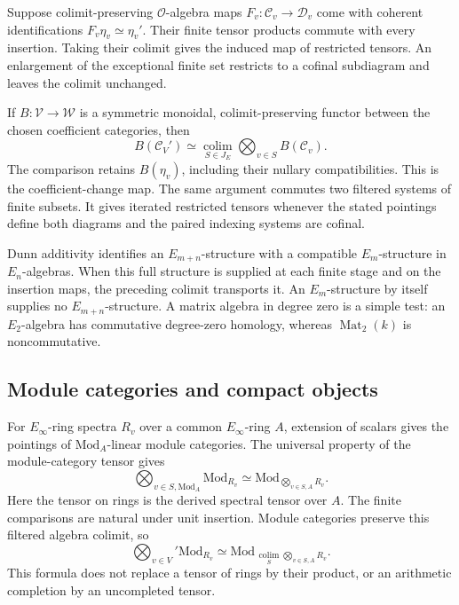 Suppose colimit-preserving \(\mathcal O\)-algebra maps
\(F_v:\mathcal C_v\to\mathcal D_v\) come with coherent
identifications \(F_v\eta_v\simeq\eta_v'\).
Their finite tensor products commute with every insertion.
Taking their colimit gives the induced map of restricted tensors.
An enlargement of the exceptional finite set restricts to a cofinal
subdiagram and leaves the colimit unchanged.

If \(B:\mathcal V\to\mathcal W\) is a symmetric monoidal,
colimit-preserving functor between the chosen coefficient categories,
then
\[
 B(\mathcal C_V')\simeq
 \operatorname*{colim}_{S\in J_E}
     \bigotimes_{v\in S}B(\mathcal C_v).
\]
The comparison retains \(B(\eta_v)\), including their nullary
compatibilities. This is the coefficient-change map.
The same argument commutes two filtered systems of finite subsets.
It gives iterated restricted tensors whenever the stated pointings
define both diagrams and the paired indexing systems are cofinal.

Dunn additivity identifies an \(E_{m+n}\)-structure with a compatible
\(E_m\)-structure in \(E_n\)-algebras.
When this full structure is supplied at each finite stage and on
the insertion maps, the preceding colimit transports it.
An \(E_m\)-structure by itself supplies no \(E_{m+n}\)-structure.
A matrix algebra in degree zero is a simple test: an \(E_2\)-algebra
has commutative degree-zero homology, whereas
\(\operatorname{Mat}_2(k)\) is noncommutative.

\subsection{Module categories and compact objects}

For \(E_\infty\)-ring spectra \(R_v\) over a common \(E_\infty\)-ring
\(A\), extension of scalars gives the pointings of
\(\mathrm{Mod}_A\)-linear module categories.
The universal property of the module-category tensor gives
\[
 \bigotimes_{v\in S,\mathrm{Mod}_A}\mathrm{Mod}_{R_v}
 \simeq
 \mathrm{Mod}_{\bigotimes_{v\in S,A}R_v}.
\]
Here the tensor on rings is the derived spectral tensor over \(A\).
The finite comparisons are natural under unit insertion.
Module categories preserve this filtered algebra colimit, so
\[
 \bigotimes_{v\in V}'\mathrm{Mod}_{R_v}
 \simeq
 \mathrm{Mod}_{\,\operatorname*{colim}_{S}
                    \bigotimes_{v\in S,A}R_v}.
\]
This formula does not replace a tensor of rings by their product,
or an arithmetic completion by an uncompleted tensor.


